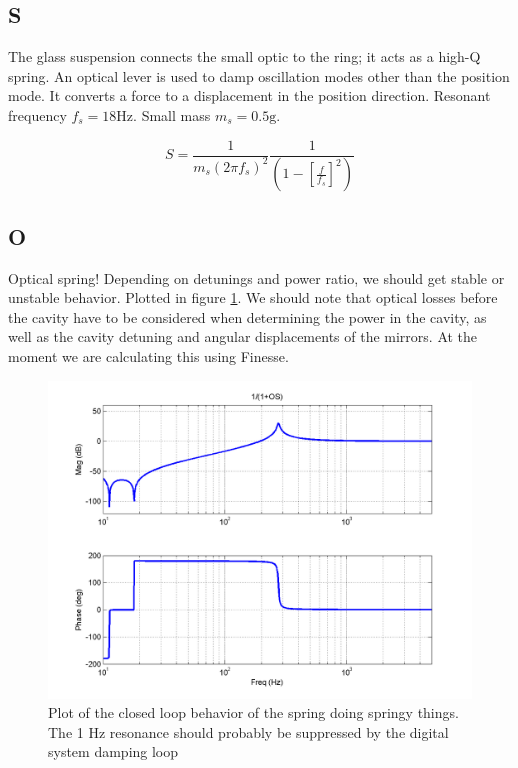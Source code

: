 \subsection{S}

The glass suspension connects the small optic to the ring; it acts as a high-Q spring. An optical lever is used to damp oscillation modes other than the position mode. It converts a force to a displacement in the position direction.  Resonant frequency $f_s = 18 \mbox{Hz}$.  Small mass $m_s = 0.5 \mbox{g}$.

\begin{equation}
S = \frac{1}{m_s (2 \pi f_s)^2}\frac{1}{\left(1 - \left[\frac{f}{f_s}\right]^2\right)}
\label{eq:S}
\end{equation}

\subsection{O}

Optical spring! Depending on detunings and power ratio, we should get stable or unstable behavior. Plotted in figure \ref{fig:O}.  We should note that optical losses before the cavity have to be considered when determining the power in the cavity, as well as the cavity detuning and angular displacements of the mirrors.  At the moment we are calculating this using Finesse.
\vspace{30pt}

\begin{figure}%
\includegraphics[width=\columnwidth]{figures/controls/O.png}%
\caption[Optical spring]{Plot of the closed loop behavior of the spring doing springy things.  The 1 Hz resonance should probably be suppressed by the digital system damping loop}
\label{fig:O}%
\end{figure}

